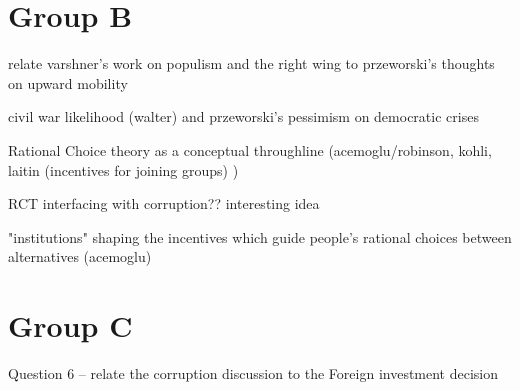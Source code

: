 \documentclass[12pt]{article}
\begin{document}
\section*{Group B}

relate varshner's work on populism and the right wing to przeworski's thoughts on upward mobility

civil war likelihood (walter) and przeworski's pessimism on democratic crises

Rational Choice theory as a conceptual throughline (acemoglu/robinson, kohli, laitin (incentives for joining groups) )

RCT interfacing with corruption?? interesting idea

"institutions" shaping the incentives which guide people's rational choices between alternatives (acemoglu)

\section*{Group C}

Question 6 -- relate the corruption discussion to the Foreign investment decision

\printbibliography
\end{document}
